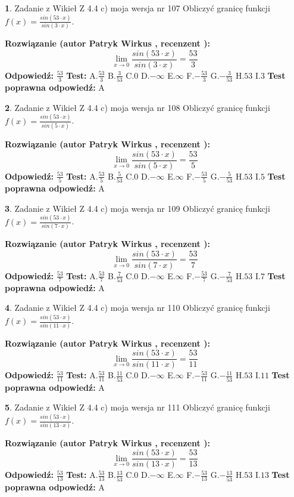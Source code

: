 \documentclass[12pt, a4paper]{article}
\theoremstyle{definition} %
\newtheorem{zad}{}
\newcommand{\zadStart}[1]{\begin{zad}#1\newline}
\newcommand{\zadStop}{\end{zad}}
\newcommand{\rozwStart}[2]{\noindent \textbf{Rozwiązanie (autor #1 , recenzent #2): }\newline}
\newcommand{\rozwStop}{\newline}
\newcommand{\odpStart}{\noindent \textbf{Odpowiedź:}\newline}
\newcommand{\odpStop}{\newline}
\newcommand{\testStart}{\noindent \textbf{Test:}\newline}
\newcommand{\testStop}{\newline}
\newcommand{\kluczStart}{\noindent \textbf{Test poprawna odpowiedź:}\newline}
\newcommand{\kluczStop}{\newline}
\begin{document}
\zadStart{Zadanie z Wikieł Z 4.4 c) moja wersja nr 107}
Obliczyć granicę funkcji $f(x)=\frac{sin(53\cdot x)}{sin(3\cdot x)}$.
\zadStop
\rozwStart{Patryk Wirkus}{}
$$\lim\limits_{x\to 0}\frac{sin(53\cdot x)}{sin(3\cdot x)}=
\frac{53}{3}$$
\rozwStop
\odpStart
$\frac{53}{3}$
\odpStop
\testStart
A.$\frac{53}{3}$
B.$\frac{3}{53}$
C.$0$
D.$-\infty$
E.$\infty$
F.$-\frac{53}{3}$
G.$-\frac{3}{53}$
H.$53$
I.$3$
\testStop
\kluczStart
A
\kluczStop



\zadStart{Zadanie z Wikieł Z 4.4 c) moja wersja nr 108}
Obliczyć granicę funkcji $f(x)=\frac{sin(53\cdot x)}{sin(5\cdot x)}$.
\zadStop
\rozwStart{Patryk Wirkus}{}
$$\lim\limits_{x\to 0}\frac{sin(53\cdot x)}{sin(5\cdot x)}=
\frac{53}{5}$$
\rozwStop
\odpStart
$\frac{53}{5}$
\odpStop
\testStart
A.$\frac{53}{5}$
B.$\frac{5}{53}$
C.$0$
D.$-\infty$
E.$\infty$
F.$-\frac{53}{5}$
G.$-\frac{5}{53}$
H.$53$
I.$5$
\testStop
\kluczStart
A
\kluczStop



\zadStart{Zadanie z Wikieł Z 4.4 c) moja wersja nr 109}
Obliczyć granicę funkcji $f(x)=\frac{sin(53\cdot x)}{sin(7\cdot x)}$.
\zadStop
\rozwStart{Patryk Wirkus}{}
$$\lim\limits_{x\to 0}\frac{sin(53\cdot x)}{sin(7\cdot x)}=
\frac{53}{7}$$
\rozwStop
\odpStart
$\frac{53}{7}$
\odpStop
\testStart
A.$\frac{53}{7}$
B.$\frac{7}{53}$
C.$0$
D.$-\infty$
E.$\infty$
F.$-\frac{53}{7}$
G.$-\frac{7}{53}$
H.$53$
I.$7$
\testStop
\kluczStart
A
\kluczStop



\zadStart{Zadanie z Wikieł Z 4.4 c) moja wersja nr 110}
Obliczyć granicę funkcji $f(x)=\frac{sin(53\cdot x)}{sin(11\cdot x)}$.
\zadStop
\rozwStart{Patryk Wirkus}{}
$$\lim\limits_{x\to 0}\frac{sin(53\cdot x)}{sin(11\cdot x)}=
\frac{53}{11}$$
\rozwStop
\odpStart
$\frac{53}{11}$
\odpStop
\testStart
A.$\frac{53}{11}$
B.$\frac{11}{53}$
C.$0$
D.$-\infty$
E.$\infty$
F.$-\frac{53}{11}$
G.$-\frac{11}{53}$
H.$53$
I.$11$
\testStop
\kluczStart
A
\kluczStop



\zadStart{Zadanie z Wikieł Z 4.4 c) moja wersja nr 111}
Obliczyć granicę funkcji $f(x)=\frac{sin(53\cdot x)}{sin(13\cdot x)}$.
\zadStop
\rozwStart{Patryk Wirkus}{}
$$\lim\limits_{x\to 0}\frac{sin(53\cdot x)}{sin(13\cdot x)}=
\frac{53}{13}$$
\rozwStop
\odpStart
$\frac{53}{13}$
\odpStop
\testStart
A.$\frac{53}{13}$
B.$\frac{13}{53}$
C.$0$
D.$-\infty$
E.$\infty$
F.$-\frac{53}{13}$
G.$-\frac{13}{53}$
H.$53$
I.$13$
\testStop
\kluczStart
A
\kluczStop
\end{document}

